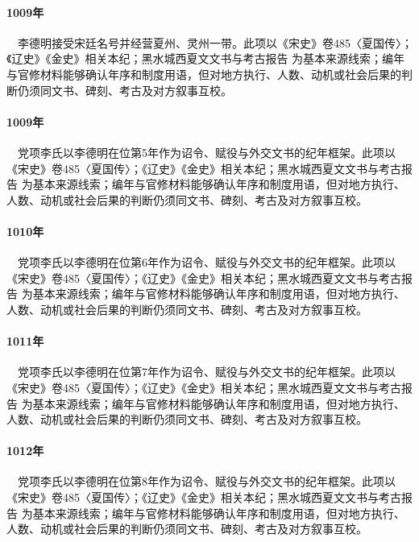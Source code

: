 \paragraph{1009年}　李德明接受宋廷名号并经营夏州、灵州一带。此项以《宋史》卷485〈夏国传〉；《辽史》《金史》相关本纪；黑水城西夏文文书与考古报告 为基本来源线索；编年与官修材料能够确认年序和制度用语，但对地方执行、人数、动机或社会后果的判断仍须同文书、碑刻、考古及对方叙事互校。

\paragraph{1009年}　党项李氏以李德明在位第5年作为诏令、赋役与外交文书的纪年框架。此项以《宋史》卷485〈夏国传〉；《辽史》《金史》相关本纪；黑水城西夏文文书与考古报告 为基本来源线索；编年与官修材料能够确认年序和制度用语，但对地方执行、人数、动机或社会后果的判断仍须同文书、碑刻、考古及对方叙事互校。

\paragraph{1010年}　党项李氏以李德明在位第6年作为诏令、赋役与外交文书的纪年框架。此项以《宋史》卷485〈夏国传〉；《辽史》《金史》相关本纪；黑水城西夏文文书与考古报告 为基本来源线索；编年与官修材料能够确认年序和制度用语，但对地方执行、人数、动机或社会后果的判断仍须同文书、碑刻、考古及对方叙事互校。

\paragraph{1011年}　党项李氏以李德明在位第7年作为诏令、赋役与外交文书的纪年框架。此项以《宋史》卷485〈夏国传〉；《辽史》《金史》相关本纪；黑水城西夏文文书与考古报告 为基本来源线索；编年与官修材料能够确认年序和制度用语，但对地方执行、人数、动机或社会后果的判断仍须同文书、碑刻、考古及对方叙事互校。

\paragraph{1012年}　党项李氏以李德明在位第8年作为诏令、赋役与外交文书的纪年框架。此项以《宋史》卷485〈夏国传〉；《辽史》《金史》相关本纪；黑水城西夏文文书与考古报告 为基本来源线索；编年与官修材料能够确认年序和制度用语，但对地方执行、人数、动机或社会后果的判断仍须同文书、碑刻、考古及对方叙事互校。

